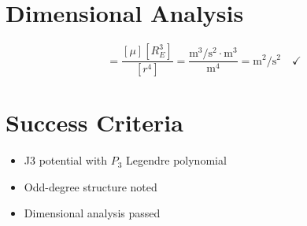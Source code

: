 \documentclass[11pt]{article}
\begin{document}
\section{Dimensional Analysis}

\begin{equation}
[R_{J3}] = \frac{[\mu][R_E^3]}{[r^4]} = \frac{\text{m}^3/\text{s}^2 \cdot \text{m}^3}{\text{m}^4} = \text{m}^2/\text{s}^2 \quad \checkmark
\end{equation}

\section{Success Criteria}
\begin{itemize}
    \item[$\checkmark$] J3 potential with $P_3$ Legendre polynomial
    \item[$\checkmark$] Odd-degree structure noted
    \item[$\checkmark$] Dimensional analysis passed
\end{itemize}
\end{document}
